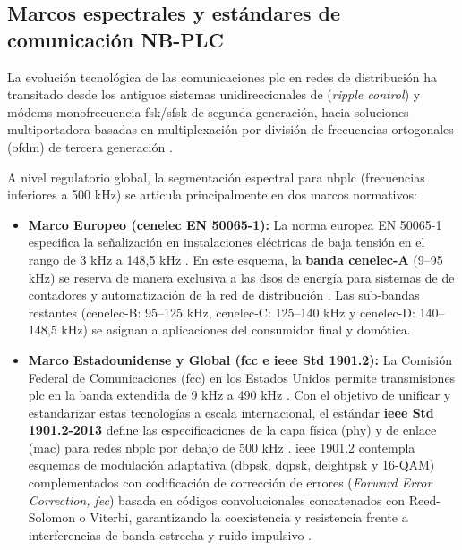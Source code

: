 \subsection{Marcos espectrales y estándares de comunicación NB-PLC}
\label{subsec:marcos_espectrales}

La evolución tecnológica de las comunicaciones \gls{plc} en redes de distribución ha transitado desde los antiguos sistemas unidireccionales de  (\textit{ripple control}) y módems monofrecuencia \gls{fsk}/\gls{sfsk} de segunda generación, hacia soluciones multiportadora basadas en multiplexación por división de frecuencias ortogonales (\gls{ofdm}) de tercera generación \cite{5764444}.

A nivel regulatorio global, la segmentación espectral para \gls{nbplc} (frecuencias inferiores a 500 kHz) se articula principalmente en dos marcos normativos:
\begin{itemize}
    \item \textbf{Marco Europeo (\gls{cenelec} EN 50065-1):} La norma europea EN 50065-1 especifica la señalización en instalaciones eléctricas de baja tensión en el rango de 3 kHz a 148,5 kHz \cite{EN50065_1}. En este esquema, la \textbf{banda \gls{cenelec}-A} (9--95 kHz) se reserva de manera exclusiva a las \glspl{dso} de energía para sistemas de  de contadores y automatización de la red de distribución \cite{5764444}. Las sub-bandas restantes (\gls{cenelec}-B: 95--125 kHz, \gls{cenelec}-C: 125--140 kHz y \gls{cenelec}-D: 140--148,5 kHz) se asignan a aplicaciones del consumidor final y domótica.
    \item \textbf{Marco Estadounidense y Global (\gls{fcc} e \gls{ieee} Std 1901.2):} La Comisión Federal de Comunicaciones (\gls{fcc}) en los Estados Unidos permite transmisiones \gls{plc} en la banda extendida de 9 kHz a 490 kHz \cite{6679210}. Con el objetivo de unificar y estandarizar estas tecnologías a escala internacional, el estándar \textbf{\gls{ieee} Std 1901.2-2013} define las especificaciones de la capa física (\gls{phy}) y de enlace (\gls{mac}) para redes \gls{nbplc} por debajo de 500 kHz \cite{6679210}. \gls{ieee} 1901.2 contempla esquemas de modulación adaptativa (\gls{dbpsk}, \gls{dqpsk}, \gls{deightpsk} y 16-QAM) complementados con codificación de corrección de errores (\textit{Forward Error Correction, \gls{fec}}) basada en códigos convolucionales concatenados con Reed-Solomon o Viterbi, garantizando la coexistencia y resistencia frente a interferencias de banda estrecha y ruido impulsivo \cite{6679210, 7443190}.
\end{itemize}

